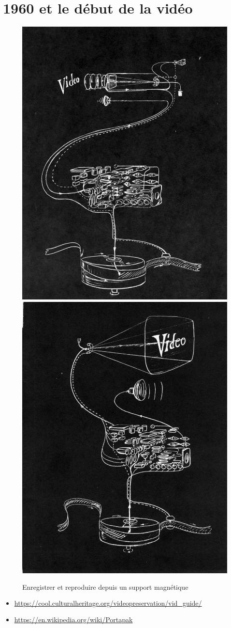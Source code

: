 \documentclass[
  french,
]{book}
\providecommand{\tightlist}{%
  \setlength{\itemsep}{0pt}\setlength{\parskip}{0pt}}
\begin{document}
\hypertarget{et-le-duxe9but-de-la-viduxe9o}{%
\section{1960 et le début de la vidéo}\label{et-le-duxe9but-de-la-viduxe9o}}

\begin{figure}

{\centering \includegraphics[width=0.49\linewidth]{medias/corpus/1960/Charles_Bensinger_video_guide_2} \includegraphics[width=0.49\linewidth]{medias/corpus/1960/Charles_Bensinger_video_guide_3} 

}

\caption{Enregistrer et reproduire depuis un support magnétique}\label{fig:unnamed-chunk-2}
\end{figure}

\begin{itemize}
\tightlist
\item
  \url{https://cool.culturalheritage.org/videopreservation/vid_guide/}
\item
  \url{https://en.wikipedia.org/wiki/Portapak}
\end{itemize}
\end{document}

